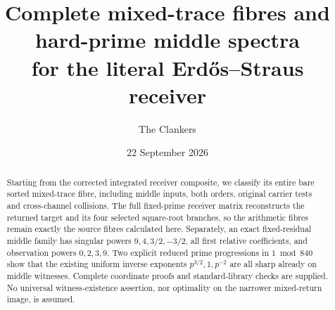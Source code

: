 \documentclass[11pt,reqno]{amsart}
\title[Mixed trace fibres and hard middle spectra]{Complete mixed-trace fibres and hard-prime middle spectra\\
for the literal Erd\H{o}s--Straus receiver}
\author{The Clankers}
\date{22 September 2026}
\begin{document}
\begin{abstract}
Starting from the corrected integrated receiver composite, we classify its
entire bare sorted mixed-trace fibre, including middle inputs, both orders,
original carrier tests and cross-channel collisions. The full fixed-prime
receiver matrix reconstructs the returned target and its four selected
square-root branches, so the arithmetic fibres remain exactly the source
fibres calculated here. Separately, an exact
fixed-residual middle family has singular powers $9,4,3/2,-3/2$, all first
relative coefficients, and observation powers $0,2,3,9$. Two explicit reduced
prime progressions in $1\bmod840$ show that the existing uniform inverse
exponents $p^{3/2},1,p^{-2}$ are all sharp already on middle witnesses.
Complete coordinate proofs and standard-library checks are supplied.
No universal witness-existence assertion, nor optimality on the narrower
mixed-return image, is assumed.
\end{abstract}
\maketitle
\enlargethispage{3pt}


\end{document}
